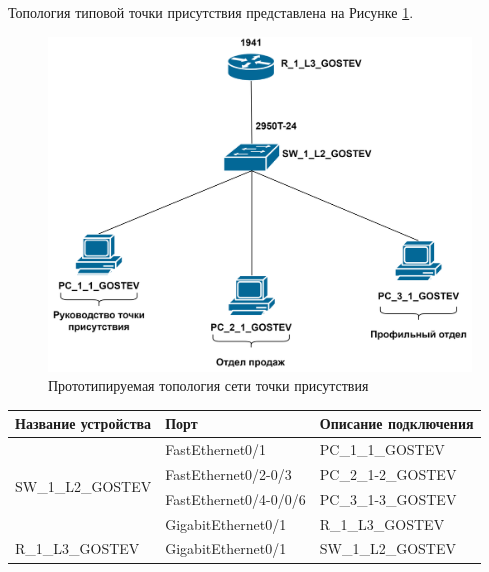 \documentclass[14pt, a4paper]{extarticle}
\numberwithin{equation}{section}
\begin{document}
Топология типовой точки присутствия представлена на Рисунке \ref{fig:tpTopo}.
\begin{figure}[H]
        \centering
        \includegraphics[scale=0.2]{topo_tp.png}
        \caption{Прототипируемая топология сети точки присутствия}
        \label{fig:tpTopo}
\end{figure}

\begin{table}[H]
\small
\centering
\begin{tabular}{|l|l|l|}
\hline
\textbf{Название устройства}       & \textbf{Порт}         & \textbf{Описание подключения} \\ \hline
\multirow{4}{*}{SW\_1\_L2\_GOSTEV} & FastEthernet0/1       & PC\_1\_1\_GOSTEV              \\ \cline{2-3} 
                                   & FastEthernet0/2-0/3   & PC\_2\_1-2\_GOSTEV        \\ \cline{2-3} 
                                   & FastEthernet0/4-0/0/6 & PC\_3\_1-3\_GOSTEV            \\ \cline{2-3} 
                                   & GigabitEthernet0/1    & R\_1\_L3\_GOSTEV              \\ \hline
R\_1\_L3\_GOSTEV                   & GigabitEthernet0/1    & SW\_1\_L2\_GOSTEV             \\ \hline
\end{tabular}
\end{table}
\end{document}
